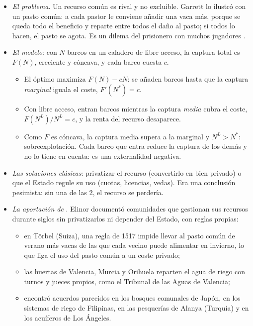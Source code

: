 \documentclass[11pt]{article}
\begin{document}
\begin{itemize}
\item \emph{El problema}. Un recurso común es rival y no excluible. Garrett \textcite{Hardin1968Tragedy} lo ilustró con un pasto común: a cada pastor le conviene añadir una vaca más, porque se queda todo el beneficio y reparte entre todos el daño al pasto; si todos lo hacen, el pasto se agota. Es un dilema del prisionero con muchos jugadores .
\item \emph{El modelo}\nocite{Gordon1954Economic}: con $N$ barcos en un caladero de libre acceso, la captura total es $F(N)$, creciente y cóncava, y cada barco cuesta $c$.
  \begin{itemize}
  \item El óptimo maximiza $F(N)-cN$: se añaden barcos hasta que la captura \emph{marginal} iguala el coste, $F'(N^*)=c$.
  \item Con libre acceso, entran barcos mientras la captura \emph{media} cubra el coste, $F(N^L)/N^L=c$, y la renta del recurso desaparece.
  \item Como $F$ es cóncava, la captura media supera a la marginal y $N^L>N^*$: sobreexplotación. Cada barco que entra reduce la captura de los demás y no lo tiene en cuenta: es una externalidad negativa.
  \end{itemize}
\item \emph{Las soluciones clásicas}: privatizar el recurso (convertirlo en bien privado) o que el Estado regule su uso (cuotas, licencias, vedas). Era una conclusión pesimista: sin una de las 2, el recurso se perdería.
\item \emph{La aportación de }. Elinor \textcite{Ostrom1990Governing} documentó comunidades que gestionan sus recursos durante siglos sin privatizarlos ni depender del Estado, con reglas propias:
  \begin{itemize}
  \item en Törbel (Suiza), una regla de 1517 impide llevar al pasto común de verano más vacas de las que cada vecino puede alimentar en invierno, lo que liga el uso del pasto común a un coste privado\nocite{Ostrom1990Governing,Netting1981Balancing};
  \item las huertas de Valencia, Murcia y Orihuela reparten el agua de riego con turnos y jueces propios, como el Tribunal de las Aguas de Valencia;
  \item encontró acuerdos parecidos en los bosques comunales de Japón, en los sistemas de riego de Filipinas, en las pesquerías de Alanya (Turquía) y en los acuíferos de Los Ángeles.

\end{itemize}
\end{itemize}
\end{document}
